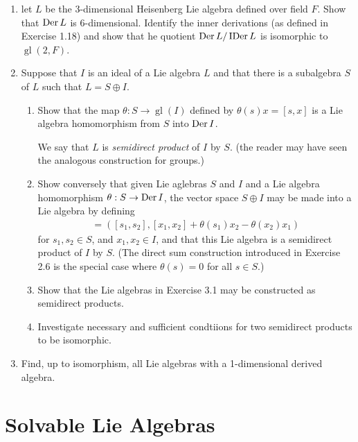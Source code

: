 \documentclass[12pt,a4paper]{report}
\newcommand{\GL}{\operatorname{gl}}
\newcommand{\IDER}{\operatorname{IDer}}
\begin{document}
\begin{enumerate}[label=3.\arabic*.]
\item let $L$ be the 3-dimensional Heisenberg Lie algebra defined over field $F$.  Show that $\operatorname{Der} L$ is 6-dimensional.  Identify the inner derivations (as defined in Exercise 1.18) and show that he quotient $\DER L/\IDER L$ is isomorphic to $\GL(2,F)$.

\item Suppose that $I$ is an ideal of a Lie algebra $L$ and that there is a subalgebra $S$ of $L$ such that $L=S\oplus I$.

\begin{enumerate}[label=(\roman*)]

	\item Show that the map $\theta : S \to \GL(I)$ defined by $\theta(s)x=[s,x]$ is a Lie algebra homomorphism from $S$ into $\operatorname{Der} I$.
	
	We say that $L$ is \textit{semidirect product} of $I$ by $S$.  (the reader may have seen the analogous construction for groups.)
	
	\item Show conversely that given Lie aglebras $S$ and $I$ and a Lie algebra homomorphism $\theta : S \to \operatorname{Der} I$, the vector space $S \oplus I$ may be made into a Lie algebra by defining
	\begin{align*}
		[(s_1,x_1),(s_2,x_2)] = ([s_1,s_2],[x_1,x_2]+\theta(s_1)x_2-\theta(x_2)x_1)
	\end{align*}for $s_1,s_2 \in S$, and $x_1,x_2 \in I$, and that this Lie algebra is a semidirect product of $I$ by $S$.  (The direct sum construction introduced in Exercise 2.6 is the special case where $\theta(s)=0$ for all $s \in S$.)
	
	\item Show that the Lie algebras in Exercise 3.1 may be constructed as semidirect products.
	
	\item Investigate necessary and sufficient condtiions for two semidirect products to be isomorphic.

\end{enumerate}

\item Find, up to isomorphism, all Lie algebras with a 1-dimensional derived algebra.

\end{enumerate}

\chapter{Solvable Lie Algebras}
\end{document}
